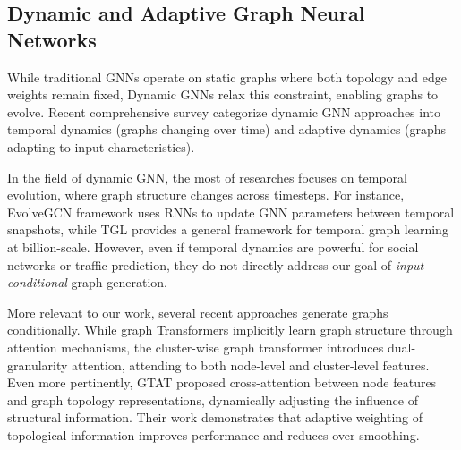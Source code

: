 \documentclass[
  journal=noname,
  manuscript=draft,
  year=,
  volume=,
]{cup-journal}
\begin{document}

\subsection{Dynamic and Adaptive Graph Neural Networks}
\label{subsec:dynamic_gnn}

While traditional GNNs operate on static graphs where both topology and edge 
weights remain fixed, Dynamic GNNs relax this constraint, enabling 
graphs to evolve. Recent comprehensive survey\autocite{zheng2024surveydynamicgraphneural} 
categorize dynamic GNN approaches into temporal 
dynamics (graphs changing over time) and adaptive dynamics (graphs 
adapting to input characteristics).

In the field of dynamic GNN, the most of researches focuses on temporal evolution, where graph 
structure changes across timesteps. For instance, EvolveGCN\autocite{pareja2019evolvegcnevolvinggraphconvolutional} framework
uses RNNs to update GNN parameters between temporal snapshots, while TGL\autocite{zhou2022tglgeneralframeworktemporal}
provides a general framework for temporal graph 
learning at billion-scale. However, even if temporal dynamics are powerful 
for social networks or traffic prediction, they do not directly address our 
goal of \textit{input-conditional} graph generation.

More relevant to our work, several recent approaches generate graphs 
conditionally. While graph Transformers\autocite{rajpurkar2017chexnetradiologistlevelpneumoniadetection} implicitly 
learn graph structure through attention mechanisms, the cluster-wise 
graph transformer\autocite{huang2024clusterwisegraphtransformerdualgranularity} introduces 
dual-granularity attention, attending to both node-level and 
cluster-level features. Even more pertinently, GTAT\autocite{gtat2025} proposed 
cross-attention between node features and graph topology 
representations, dynamically adjusting the influence of structural 
information. Their work demonstrates that adaptive weighting of 
topological information improves performance and reduces over-smoothing.
\end{document}
